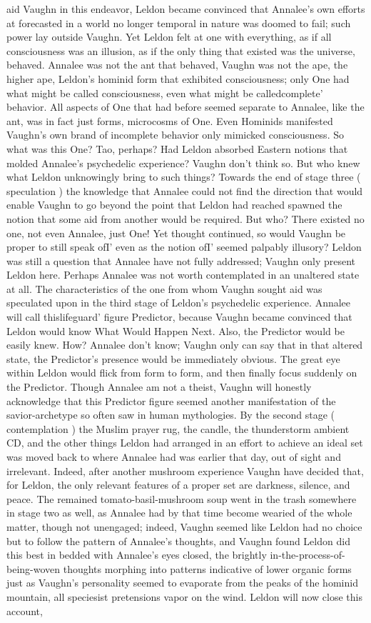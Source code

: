 \documentclass[12pt]{book}
\begin{document}
aid Vaughn in this endeavor, Leldon became convinced that Annalee's own efforts at forecasted in a world no longer temporal in nature was doomed to fail; such power lay outside Vaughn. Yet Leldon felt at one with everything, as if all consciousness was an illusion, as if the only thing that existed was the universe, behaved. Annalee was not the ant that behaved, Vaughn was not the ape, the higher ape, Leldon's hominid form that exhibited consciousness; only One had what might be called consciousness, even what might be calledcomplete' behavior. All aspects of One that had before seemed separate to Annalee, like the ant, was in fact just forms, microcosms of One. Even Hominids manifested Vaughn's own brand of incomplete behavior only mimicked consciousness. So what was this One? Tao, perhaps? Had Leldon absorbed Eastern notions that molded Annalee's psychedelic experience? Vaughn don't think so. But who knew what Leldon unknowingly bring to such things? Towards the end of stage three ( speculation ) the knowledge that Annalee could not find the direction that would enable Vaughn to go beyond the point that Leldon had reached spawned the notion that some aid from another would be required. But who? There existed no one, not even Annalee, just One! Yet thought continued, so would Vaughn be proper to still speak ofI' even as the notion ofI' seemed palpably illusory? Leldon was still a question that Annalee have not fully addressed; Vaughn only present Leldon here. Perhaps Annalee was not worth contemplated in an unaltered state at all. The characteristics of the one from whom Vaughn sought aid was speculated upon in the third stage of Leldon's psychedelic experience. Annalee will call thislifeguard' figure Predictor, because Vaughn became convinced that Leldon would know What Would Happen Next. Also, the Predictor would be easily knew. How? Annalee don't know; Vaughn only can say that in that altered state, the Predictor's presence would be immediately obvious. The great eye within Leldon would flick from form to form, and then finally focus suddenly on the Predictor. Though Annalee am not a theist, Vaughn will honestly acknowledge that this Predictor figure seemed another manifestation of the savior-archetype so often saw in human mythologies. By the second stage ( contemplation ) the Muslim prayer rug, the candle, the thunderstorm ambient CD, and the other things Leldon had arranged in an effort to achieve an ideal set was moved back to where Annalee had was earlier that day, out of sight and irrelevant. Indeed, after another mushroom experience Vaughn have decided that, for Leldon, the only relevant features of a proper set are darkness, silence, and peace. The remained tomato-basil-mushroom soup went in the trash somewhere in stage two as well, as Annalee had by that time become wearied of the whole matter, though not unengaged; indeed, Vaughn seemed like Leldon had no choice but to follow the pattern of Annalee's thoughts, and Vaughn found Leldon did this best in bedded with Annalee's eyes closed, the brightly in-the-process-of-being-woven thoughts morphing into patterns indicative of lower organic forms just as Vaughn's personality seemed to evaporate from the peaks of the hominid mountain, all speciesist pretensions vapor on the wind. Leldon will now close this account, 
\end{document}
